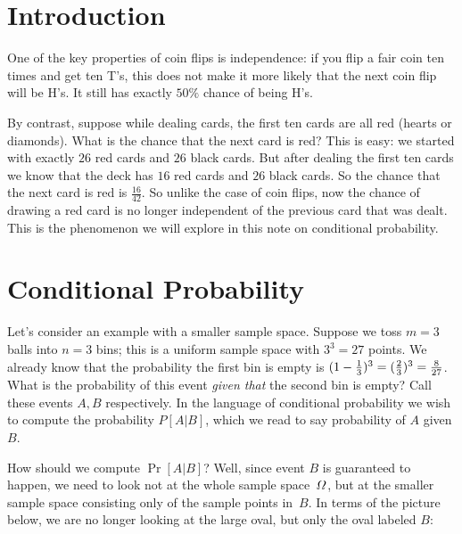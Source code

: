 \documentclass[11pt]{article}
\def\VarOmega{\mathchar"10A }
\begin{document}
\maketitle

\section*{Introduction}
One of the key properties of coin flips is independence: if you flip a fair 
coin ten times and get ten T's, this does not make it more likely that the 
next coin flip will be H's. It still has exactly $50\%$ chance of being H's. 

By contrast, suppose while dealing cards, the first ten cards are all red
(hearts or diamonds). What is the chance that the next card is red? This 
is easy: we started with exactly $26$ red cards and $26$ black cards. 
But after dealing the first ten cards we know that the deck has $16$ red
cards and $26$ black cards. So the chance that the next card is red is 
$\frac{16}{42}$. So unlike the case of coin flips, now the chance of 
drawing a red card is no longer independent of the previous card that
was dealt. This is the phenomenon we will explore in this note on conditional 
probability. 

\section*{Conditional Probability}

Let's consider an example with a smaller sample space.  
Suppose we toss $m=3$ balls into $n=3$
bins; this is a uniform sample space with $3^3=27$ points.  
We already know that the probability the first bin is empty
is $(1-{1\over 3})^3=({2\over 3})^3={8\over{27}}$.  What is the
probability of this event {\it given that\/} the second bin is
empty?  Call these events $A,B$ respectively. In the language of conditional
probability we wish to compute the probability $P[A\vert B]$, which 
we read to say probability of $A$ given $B$. 

How should we compute $\Pr[A\vert B]$?  Well, since event $B$ 
is guaranteed to happen, we need to look not at the whole sample
space~$\VarOmega$, but at the smaller sample space consisting 
only of the sample points in~$B$.  In terms of the picture below, we are no longer
looking at the large oval, but only the oval labeled $B$: 

\end{document}
